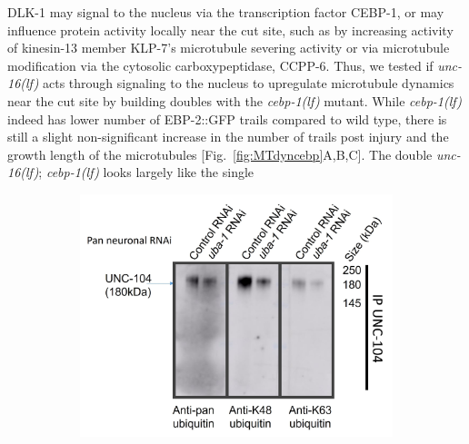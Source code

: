 \begin{appendices}
	DLK-1 may signal to the nucleus via the transcription factor CEBP-1, or may influence protein activity locally near the cut site, such as by increasing activity of kinesin-13	member KLP-7's microtubule severing activity or via microtubule modification via the cytosolic carboxypeptidase, CCPP-6. Thus, we tested if \textit{unc-16(lf)} acts through signaling to the nucleus to upregulate microtubule dynamics near the cut site by building doubles with the \textit{cebp-1(lf)} mutant. While \textit{cebp-1(lf)} indeed has lower number of EBP-2::GFP trails compared to wild type, there is still a slight non-significant increase in the number of trails post injury and the growth length of the microtubules [Fig.~\ref{fig:MTdyncebp}A,B,C]. The double \textit{unc-16(lf)}; \textit{cebp-1(lf)} looks largely like the single
	\begin{figure}[H]
	\begin{minipage}[t]{0.65\textwidth}
		\vspace{0pt}
		\begin{subfigure}{1\textwidth}
			\caption{}
			\includegraphics[width=\textwidth]{figs/example}
			

\end{subfigure}
\end{minipage}
\end{figure}
\end{appendices}
